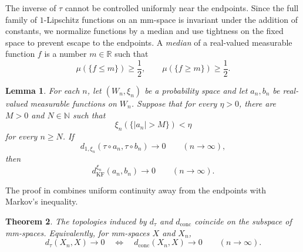 \documentclass[10pt,a4paper]{amsart}
\newtheorem{theorem}{Theorem}[section]
\newtheorem{lemma}[theorem]{Lemma}
\newcommand{\R}{\mathbb R}
\newcommand{\dconc}{d_{\mathrm{conc}}}
\newcommand{\dtau}{d_{\tau}}
\newcommand{\kf}{d_{\operatorname{KF}}}
\begin{document}
The inverse of $\tau$ cannot be controlled uniformly near the endpoints. Since the full family of $1$-Lipschitz functions on an mm-space is invariant under the addition of constants, we normalize functions by a median and use tightness on the fixed space to prevent escape to the endpoints. A \emph{median} of a real-valued measurable function $f$ is a number $m\in\R$ such that
\[
\mu(\{f\leq m\})\geq\frac12,\qquad
\mu(\{f\geq m\})\geq\frac12.
\]

\begin{lemma}
\label{lem:inversion-tightness}
For each $n$, let $(W_n,\xi_n)$ be a probability space and let $a_n,b_n$ be real-valued measurable functions on $W_n$. Suppose that for every $\eta>0$, there are $M>0$ and $N\in\mathbb N$ such that
\[
\xi_n(\{|a_n|>M\})<\eta
\]
for every $n\geq N$. If
\[
d_{1,\xi_n}(\tau\circ a_n,\tau\circ b_n)\longrightarrow0
\qquad(n\to\infty),
\]
then
\[
\kf^{\xi_n}(a_n,b_n)\longrightarrow0
\qquad(n\to\infty).
\]
\end{lemma}

The proof in  combines uniform continuity away from the endpoints with Markov's inequality.

\begin{theorem}
\label{thm:mm-topologies}
The topologies induced by $\dtau$ and $\dconc$ coincide on the subspace of mm-spaces. Equivalently, for mm-spaces $X$ and $X_n$,
\[
\dtau(X_n,X)\longrightarrow0
\quad\Longleftrightarrow\quad
\dconc(X_n,X)\longrightarrow0
\qquad(n\to\infty).
\]
\end{theorem}
\end{document}
